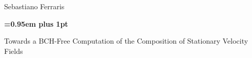 \documentclass[a4paper,10pt]{book}
\theoremstyle{definition}
\begin{document}
\begin{titlepage}
%
\pagestyle{empty}
\begingroup
\vspace*{-7\topskip}

\vspace{-0.95 cm}

\begin{figure}[!h]
		\hspace{-2.5cm} %
\end{figure}
\vspace{1cm}

\begin{center}
	{\LARGE{Sebastiano Ferraris}\par}  %
\end{center}
\vspace{1.8cm}
\begin{center}
        {\huge\bf \baselineskip=0.95em plus 1pt \expandafter{
        		Towards a BCH-Free Computation of the Composition of Stationary Velocity Fields
        \par}}
\end{center}



\vspace{2.7cm}


\end{titlepage}
\end{document}
